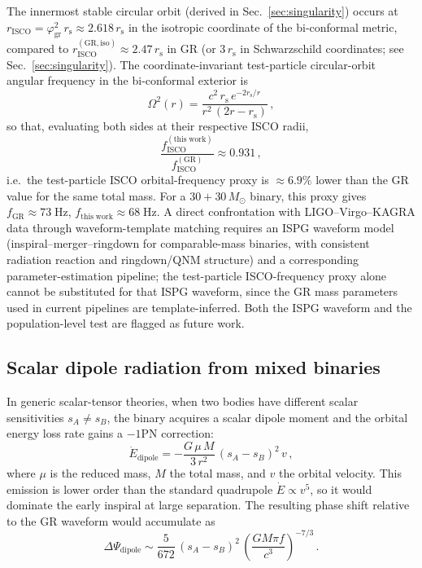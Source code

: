 \documentclass[aps,prd,onecolumn,superscriptaddress,nofootinbib,showpacs,12pt]{revtex4-2}
\newcommand{\rs}{r_{\mathrm{s}}}
\newcommand{\phigr}{\varphi_{\mathrm{gr}}}
\begin{document}
The innermost stable circular orbit (derived in
Sec.~\ref{sec:singularity}) occurs at
$r_{\mathrm{ISCO}} = \phigr^{2}\,\rs \approx 2.618\,\rs$
in the isotropic coordinate of the bi-conformal metric,
compared to $r_{\mathrm{ISCO}}^{(\mathrm{GR,iso})}
\approx 2.47\,\rs$ in GR (or $3\,\rs$ in Schwarzschild
coordinates; see Sec.~\ref{sec:singularity}).
The coordinate-invariant test-particle circular-orbit
angular frequency in the bi-conformal exterior is
\begin{equation}\label{eq:Omega_circ}
  \Omega^{2}(r)
  = \frac{c^{2}\,\rs\,e^{-2\rs/r}}
         {r^{2}\,(2r - \rs)}\,,
\end{equation}
so that, evaluating both sides at their respective
ISCO radii,
\begin{equation}\label{eq:merger_ratio}
  \frac{f_{\mathrm{ISCO}}^{(\mathrm{this\;work})}}
       {f_{\mathrm{ISCO}}^{(\mathrm{GR})}}
  \approx 0.931\,,
\end{equation}
i.e.\ the test-particle ISCO orbital-frequency proxy is
$\approx 6.9\%$ lower than the GR value for the same
total mass.  For a $30 + 30\,M_{\odot}$ binary, this
proxy gives $f_{\mathrm{GR}} \approx 73\;\mathrm{Hz}$,
$f_{\mathrm{this\;work}} \approx 68\;\mathrm{Hz}$.
A direct confrontation with LIGO--Virgo--KAGRA data
through waveform-template matching requires an ISPG
waveform model (inspiral--merger--ringdown for
comparable-mass binaries, with consistent radiation
reaction and ringdown/QNM structure) and a corresponding
parameter-estimation pipeline; the test-particle
ISCO-frequency proxy alone cannot be substituted for
that ISPG waveform, since the GR mass parameters used
in current pipelines are template-inferred.  Both the
ISPG waveform and the population-level test are flagged
as future work.

\subsection{Scalar dipole radiation from mixed binaries}
\label{sec:dipole}

In generic scalar-tensor theories, when two bodies have
different scalar sensitivities $s_{A} \neq s_{B}$, the
binary acquires a scalar dipole moment and the orbital
energy loss rate gains a $-1$PN correction:
\begin{equation}\label{eq:dipole_power}
  \dot{E}_{\mathrm{dipole}} = -\frac{G\,\mu\,M}{3\,r^{2}}\,
  (s_{A} - s_{B})^{2}\,v\,,
\end{equation}
where $\mu$ is the reduced mass, $M$ the total mass,
and $v$ the orbital velocity.  This emission is lower order
than the standard quadrupole $\dot{E} \propto v^{5}$,
so it would dominate the early inspiral at large separation.
The resulting phase shift relative to the GR waveform
would accumulate as
\begin{equation}\label{eq:dipole_phase}
  \Delta\Psi_{\mathrm{dipole}} \sim
  \frac{5}{672}\,(s_{A}-s_{B})^{2}\,
  \left(\frac{GM\pi f}{c^{3}}\right)^{-7/3}\,.
\end{equation}
\end{document}
